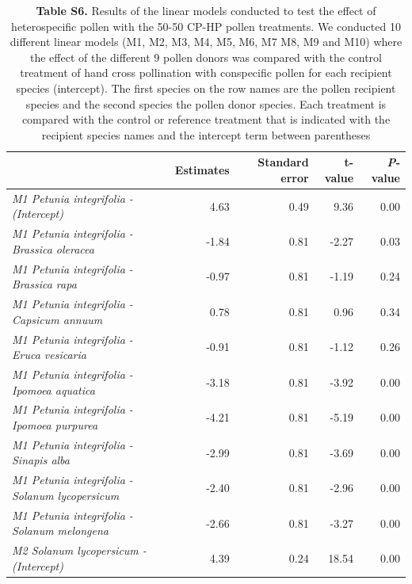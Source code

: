 \documentclass[12pt,]{article}
\begin{document}
\clearpage

\begingroup\fontsize{7}{9}\selectfont

\begin{longtable}[t]{>{\em}lrrrr}
\caption{\label{tab:unnamed-chunk-6}\textbf{Table S6.} Results of the linear models conducted to test the effect of heterospecific pollen with the 50-50 CP-HP pollen treatments. We conducted 10 different linear models (M1, M2, M3, M4, M5, M6, M7 M8, M9 and M10) where the effect of the different 9 pollen donors was compared with the control treatment of hand cross pollination with conspecific pollen for each recipient species (intercept). The first species on the row names are the pollen recipient species and the second species the pollen donor species. Each treatment is compared with the control or reference treatment that is indicated with the recipient species names and the intercept term between parentheses}\\
\toprule
\textbf{ } & \textbf{Estimates} & \textbf{Standard error} & \textbf{t-value} & \textbf{{\textit{P}}-value}\\
\midrule
\rowcolor{gray!6}  M1 Petunia integrifolia - (Intercept) & 4.63 & 0.49 & 9.36 & 0.00\\
\addlinespace
M1 Petunia integrifolia - Brassica oleracea & -1.84 & 0.81 & -2.27 & 0.03\\
\addlinespace
\rowcolor{gray!6}  M1 Petunia integrifolia - Brassica rapa & -0.97 & 0.81 & -1.19 & 0.24\\
\addlinespace
M1 Petunia integrifolia - Capsicum annuum & 0.78 & 0.81 & 0.96 & 0.34\\
\addlinespace
\rowcolor{gray!6}  M1 Petunia integrifolia - Eruca vesicaria & -0.91 & 0.81 & -1.12 & 0.26\\
\addlinespace
M1 Petunia integrifolia - Ipomoea aquatica & -3.18 & 0.81 & -3.92 & 0.00\\
\addlinespace
\rowcolor{gray!6}  M1 Petunia integrifolia - Ipomoea purpurea & -4.21 & 0.81 & -5.19 & 0.00\\
\addlinespace
M1 Petunia integrifolia - Sinapis alba & -2.99 & 0.81 & -3.69 & 0.00\\
\addlinespace
\rowcolor{gray!6}  M1 Petunia integrifolia - Solanum lycopersicum & -2.40 & 0.81 & -2.96 & 0.00\\
\addlinespace
M1 Petunia integrifolia - Solanum melongena & -2.66 & 0.81 & -3.27 & 0.00\\
\addlinespace
\rowcolor{gray!6}  M2 Solanum lycopersicum - (Intercept) & 4.39 & 0.24 & 18.54 & 0.00\\

\end{longtable}
\end{document}
